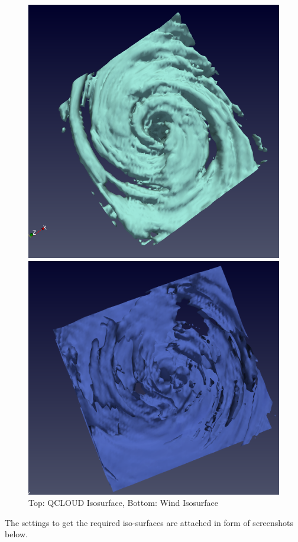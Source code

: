\documentclass[a4paper,11pt]{article}
\theoremstyle{mytheor}
\begin{document}
\begin{figure}[!h]
    \centering
    \includegraphics[scale=0.4]{Figures/P1_3_1.PNG}
    
    \vspace{1 cm}
    \includegraphics[scale=0.4]{Figures/P1_1_2.PNG}
    \caption{Top: QCLOUD Isosurface, Bottom: Wind Isosurface}
    \label{p1_1}
\end{figure}
\clearpage
The settings to get the required iso-surfaces are attached in form of screenshots below.
\end{document}
